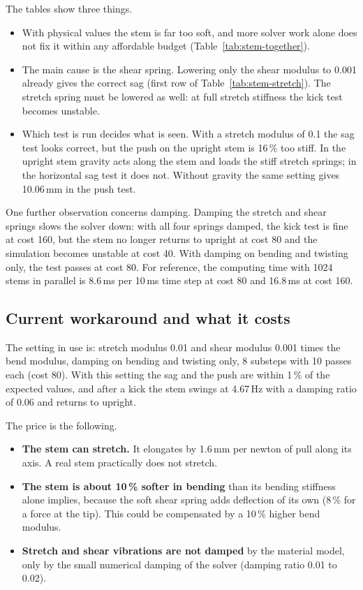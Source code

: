 The tables show three things.
\begin{itemize}
  \item With physical values the stem is far too soft, and more solver work alone does not fix it within
        any affordable budget (Table~\ref{tab:stem-together}).
  \item The main cause is the shear spring. Lowering only the shear modulus to 0.001 already gives the
        correct sag (first row of Table~\ref{tab:stem-stretch}). The stretch spring must be lowered as well: at full stretch
        stiffness the kick test becomes unstable.
  \item Which test is run decides what is seen. With a stretch modulus of 0.1 the sag test looks correct,
        but the push on the upright stem is 16\,\% too stiff. In the upright stem gravity acts along the
        stem and loads the stiff stretch springs; in the horizontal sag test it does not. Without gravity
        the same setting gives 10.06\,mm in the push test.
\end{itemize}

One further observation concerns damping. Damping the stretch and shear springs slows the solver down: with
all four springs damped, the kick test is fine at cost 160, but the stem no longer returns to upright at
cost 80 and the simulation becomes unstable at cost 40. With damping on bending and twisting only, the
test passes at cost 80. For reference, the computing time with 1024 stems in parallel is 8.6\,ms per
10\,ms time step at cost 80 and 16.8\,ms at cost 160.

\subsection{Current workaround and what it costs}

The setting in use is: stretch modulus 0.01 and shear modulus 0.001 times the bend modulus, damping on
bending and twisting only, 8 substeps with 10 passes each (cost 80). With this setting the sag and the push
are within 1\,\% of the expected values, and after a kick the stem swings at 4.67\,Hz with a damping ratio
of 0.06 and returns to upright.

The price is the following.
\begin{itemize}
  \item \textbf{The stem can stretch.} It elongates by 1.6\,mm per newton of pull along its axis. A real
        stem practically does not stretch.
  \item \textbf{The stem is about 10\,\% softer in bending} than its bending stiffness alone implies,
        because the soft shear spring adds deflection of its own (8\,\% for a force at the tip). This
        could be compensated by a 10\,\% higher bend modulus.
  \item \textbf{Stretch and shear vibrations are not damped} by the material model, only by the small
        numerical damping of the solver (damping ratio 0.01 to 0.02).
\end{itemize}


